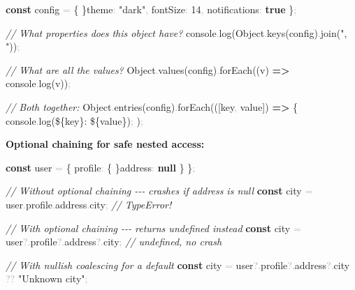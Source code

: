 \documentclass[
  justified,
  openright,
]{tufte-book}
\newcommand{\KeywordTok}[1]{\textcolor{CodeKeyword}{\textbf{#1}}}  %
\newcommand{\StringTok}[1]{\textcolor{CodeString}{#1}}              %
\newcommand{\CommentTok}[1]{\textcolor{CodeComment}{\textit{#1}}}  %
\newcommand{\CodeNumTok}[1]{\textcolor{CodeNumber}{#1}}             %
\newcommand{\CodeFuncTok}[1]{\textcolor{CodeKeyword}{#1}}           %
\newcommand{\CodeTypeTok}[1]{\textcolor{CodeType}{#1}}              %
\newcommand{\OperatorTok}[1]{\textcolor{DarkGray}{#1}}              %
\newenvironment{Shaded}{%
  \begin{mdframed}[style=TufteCode]%
}{%
  \end{mdframed}%
}
\begin{document}
\begin{Shaded}
\begin{Highlighting}[]
\KeywordTok{const} config \OperatorTok{=} \{ \}\CodeTypeTok{theme}\OperatorTok{:} \StringTok{"dark"}\OperatorTok{,} \CodeTypeTok{fontSize}\OperatorTok{:} \CodeNumTok{14}\OperatorTok{,} \CodeTypeTok{notifications}\OperatorTok{:} \KeywordTok{true} \}\OperatorTok{;}
 
\CommentTok{// What properties does this object have?}
console\OperatorTok{.}\CodeFuncTok{log}(Object\OperatorTok{.}\CodeFuncTok{keys}(config)\OperatorTok{.}\CodeFuncTok{join}(\StringTok{", "}))\OperatorTok{;}
 
\CommentTok{// What are all the values?}
Object\OperatorTok{.}\CodeFuncTok{values}(config)\OperatorTok{.}\CodeFuncTok{forEach}((v) \KeywordTok{=\textgreater{}} console\OperatorTok{.}\CodeFuncTok{log}(v))\OperatorTok{;}
 
\CommentTok{// Both together:}
Object\OperatorTok{.}\CodeFuncTok{entries}(config)\OperatorTok{.}\CodeFuncTok{forEach}(([key\OperatorTok{,} value]) \KeywordTok{=\textgreater{}} \{
  console\OperatorTok{.}\CodeFuncTok{log}(\StringTok{\textasciigrave{}}\StringTok{\$\{}key\StringTok{\}}\StringTok{: }\StringTok{\$\{}value\StringTok{\}}\StringTok{\textasciigrave{}})\OperatorTok{;}
)\OperatorTok{;}
\end{Highlighting}
\end{Shaded}

\textbf{Optional chaining for safe nested access:}

\begin{Shaded}
\begin{Highlighting}[]
\KeywordTok{const} user \OperatorTok{=} \{ \CodeTypeTok{profile}\OperatorTok{:} \{ \}\CodeTypeTok{address}\OperatorTok{:} \KeywordTok{null} \} \}\OperatorTok{;}
 
\CommentTok{// Without optional chaining {-}{-}{-} crashes if address is null}
\KeywordTok{const} city \OperatorTok{=} user\OperatorTok{.}\CodeTypeTok{profile}\OperatorTok{.}\CodeTypeTok{address}\OperatorTok{.}\CodeTypeTok{city}\OperatorTok{;} \CommentTok{// TypeError!}
 
\CommentTok{// With optional chaining {-}{-}{-} returns undefined instead}
\KeywordTok{const} city \OperatorTok{=} user\OperatorTok{?.}\CodeTypeTok{profile}\OperatorTok{?.}\CodeTypeTok{address}\OperatorTok{?.}\CodeTypeTok{city}\OperatorTok{;} \CommentTok{// undefined, no crash}
 
\CommentTok{// With nullish coalescing for a default}
\KeywordTok{const} city \OperatorTok{=} user\OperatorTok{?.}\CodeTypeTok{profile}\OperatorTok{?.}\CodeTypeTok{address}\OperatorTok{?.}\CodeTypeTok{city} \OperatorTok{??} \StringTok{"Unknown city"}\OperatorTok{;}
\end{Highlighting}
\end{Shaded}
\end{document}
